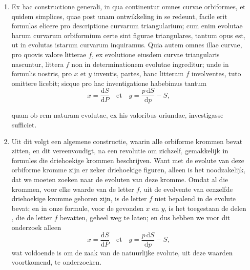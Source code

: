 \documentclass[10pt,a4paper]{article}
\newcommand{\switchenum}{\setcounter{enumi}{\arabic{enumi}-1}\switchcolumn}
\def\D{\mathrm{d}}
\begin{document}
\begin{paracol}{2}
\begin{enumerate}[topsep=1px]
		\switchcolumn*
		
		\item Ex hac constructione generali, in qua continentur omnes curvae orbiformes, et quidem simplices, quae post unam ontwikkeling in se redeunt, facile erit formulas elicere pro descriptione curvarum triangularium; cum enim evolutae harum curvarum orbiformium certe sint figurae triangulares, tantum opus est, ut in evolutas istarum curvarum inquiramus. Quia autem omnes illae curvae, pro quovis valore litterae $f$, ex evolutione eiusdem curvae triangularis nascuntur, littera $f$ non in determinationem evolutae ingreditur; unde in formulis nostris, pro $x$ et $y$ inventis, partes, hanc litteram $f$ involventes, tuto omittere licebit; sicque pro hac inventigatione habebimus tantum
		\[
			x = \frac{\D S}{\D P} \quad\text{et} \quad y = \frac{p\,\D S}{\D p}-S,
		\]
		\par quam ob rem naturam evolutae, ex his valoribus oriundae, investigasse sufficiet. 
		
		\switchenum
		\item Uit dit volgt een algemene constructie, waarin alle orbiforme krommen bevat zitten, en dit vereenvoudigt, na een revolutie om zichzelf, gemakkelijk in formules die driehoekige krommen beschrijven. Want met de evolute van deze orbiforme kromme zijn er zeker driehoekige figuren, alleen is het noodzakelijk, dat we moeten zoeken naar de evoluten van deze kromme. Omdat al die krommen, voor elke waarde van de letter $f$, uit de evolvente van eenzelfde driehoekige kromme geboren zijn, is de letter $f$ niet bepalend in de evolute bevat; en in onze formule, voor de gevonden $x$ en $y$, is het toegestaan de delen , die de letter $f$ bevatten, geheel weg te laten; en dus hebben we voor dit onderzoek alleen
		\[
			x = \frac{\D S}{\D P} \quad\text{et} \quad y = \frac{p\,\D S}{\D p}-S,
		\]
		wat voldoende is om de zaak van de natuurlijke evolute, uit deze waarden voortkomend, te onderzoeken.
		
		\switchcolumn*
		

\end{enumerate}
\end{paracol}
\end{document}
